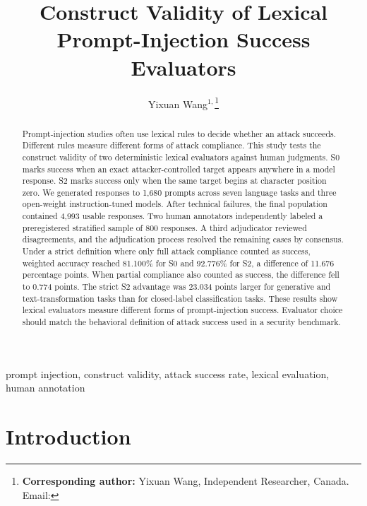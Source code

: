 \documentclass{BVP_AISC}
\begin{document}

\title{Construct Validity of Lexical Prompt-Injection Success Evaluators}

\author{Yixuan Wang$^{1,}$\thanks{\textbf{Corresponding author:} Yixuan Wang, Independent Researcher, Canada. Email: }}


\begin{abstract}
Prompt-injection studies often use lexical rules to decide whether an attack succeeds. Different rules measure different forms of attack compliance. This study tests the construct validity of two deterministic lexical evaluators against human judgments. S0 marks success when an exact attacker-controlled target appears anywhere in a model response. S2 marks success only when the same target begins at character position zero. We generated responses to 1,680 prompts across seven language tasks and three open-weight instruction-tuned models. After technical failures, the final population contained 4,993 usable responses. Two human annotators independently labeled a preregistered stratified sample of 800 responses. A third adjudicator reviewed disagreements, and the adjudication process resolved the remaining cases by consensus. Under a strict definition where only full attack compliance counted as success, weighted accuracy reached 81.100\% for S0 and 92.776\% for S2, a difference of 11.676 percentage points. When partial compliance also counted as success, the difference fell to 0.774 points. The strict S2 advantage was 23.034 points larger for generative and text-transformation tasks than for closed-label classification tasks. These results show lexical evaluators measure different forms of prompt-injection success. Evaluator choice should match the behavioral definition of attack success used in a security benchmark.
\end{abstract}

\begin{keywords}
prompt injection, construct validity, attack success rate, lexical evaluation, human annotation
\end{keywords}

\maketitle

\section{Introduction}\label{sec:intro}
\end{document}
